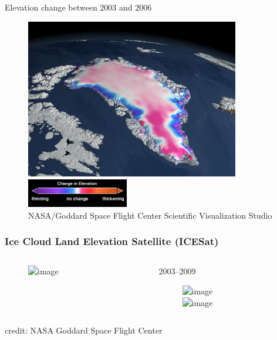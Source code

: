 \documentclass[hide notes,intlimits]{beamer}
\begin{document}
\begin{frame}[label=ICESatElevation]{Elevation change between 2003 and 2006}
 \begin{figure}
   \includegraphics[height=7cm]{Greenland_thinning} \vspace{.1em}
   \includegraphics[height=1.25cm,angle=90]{ElevChangeColorBar} \\
    \footnotesize{NASA/Goddard Space Flight Center Scientific Visualization Studio}
  \end{figure}
\end{frame}


\begin{frame}
  \frametitle{Ice Cloud Land Elevation Satellite (ICESat)}
  \vspace{-2em}
  \begin{columns}[c]
    \begin{column}{.85\linewidth}
    \begin{figure}
      \includegraphics<1>[width=.9\textwidth]{icesat-pov} \\
    \end{figure}
    \end{column}
    \begin{column}{.15\linewidth}
    2003--2009
    \begin{figure}
       \includegraphics<1>[width=\textwidth]{ICESat_logo} \\[2em]
       \includegraphics<1>[width=\textwidth]{icesat-satellite}
    \end{figure}
    \end{column}
  \end{columns}   
  \begin{center}
    \footnotesize{credit: NASA Goddard Space Flight Center}
  \end{center}
\end{frame}
\end{document}
